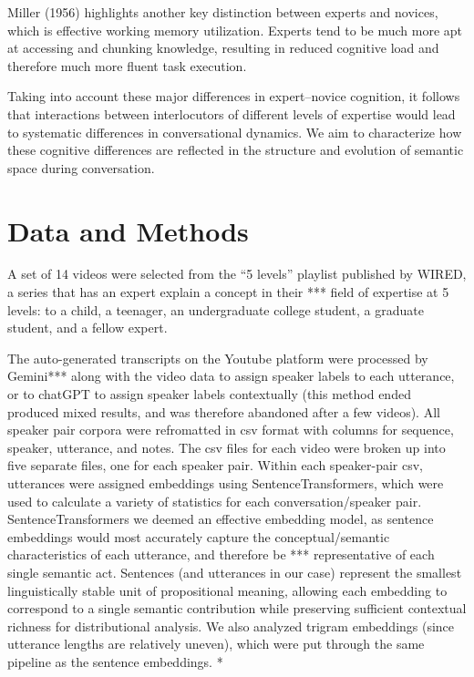 \documentclass{article}
\theoremstyle{definition}
\numberwithin{table}{section}
\begin{document}
Miller (1956) highlights another key distinction between experts and novices, which is effective working memory utilization. Experts tend to be much more apt at accessing and chunking knowledge, resulting in reduced cognitive load and therefore much more fluent task execution.

Taking into account these major differences in expert–novice cognition, it follows that interactions between interlocutors of different levels of expertise would lead to systematic differences in conversational dynamics. We aim to characterize how these cognitive differences are reflected in the structure and evolution of semantic space during conversation.

\section{Data and Methods}

A set of 14 videos were selected from the “5 levels” playlist published by WIRED, a series that has an expert explain a concept in their *** field of expertise at 5 levels: to a child, a teenager, an undergraduate college student, a graduate student, and a fellow expert. 

The auto-generated transcripts on the Youtube platform were processed by Gemini*** along with the video data to assign speaker labels to each utterance, or to chatGPT to assign speaker labels contextually (this method ended produced mixed results, and was therefore abandoned after a few videos). All speaker pair corpora were refromatted in csv format with columns for sequence, speaker, utterance, and notes. The csv files for each video were broken up into five separate files, one for each speaker pair. Within each speaker-pair csv, utterances were assigned embeddings using SentenceTransformers, which were used to calculate a variety of statistics for each conversation/speaker pair. SentenceTransformers we deemed an effective embedding model, as sentence embeddings would most accurately capture the conceptual/semantic characteristics of each utterance, and therefore be *** representative of each single semantic act. Sentences (and utterances in our case) represent the smallest linguistically stable unit of propositional meaning, allowing each embedding to correspond to a single semantic contribution while preserving sufficient contextual richness for distributional analysis. We also analyzed trigram embeddings (since utterance lengths are relatively uneven), which were put through the same pipeline as the sentence embeddings. *
\end{document}
